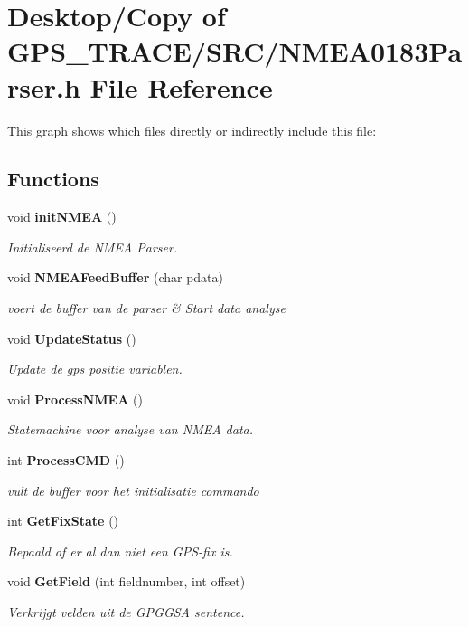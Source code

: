 \section{Desktop/Copy of GPS\_\-TRACE/SRC/NMEA0183Parser.h File Reference}
\label{_n_m_e_a0183_parser_8h}


This graph shows which files directly or indirectly include this file:\subsection*{Functions}
\begin{CompactItemize}
\item 
void {\bf initNMEA} ()
\begin{CompactList}\small\item\em Initialiseerd de NMEA Parser. \item\end{CompactList}\item 
void {\bf NMEAFeedBuffer} (char pdata)
\begin{CompactList}\small\item\em voert de buffer van de parser \& Start data analyse \item\end{CompactList}\item 
void {\bf UpdateStatus} ()
\begin{CompactList}\small\item\em Update de gps positie variablen. \item\end{CompactList}\item 
void {\bf ProcessNMEA} ()
\begin{CompactList}\small\item\em Statemachine voor analyse van NMEA data. \item\end{CompactList}\item 
int {\bf ProcessCMD} ()
\begin{CompactList}\small\item\em vult de buffer voor het initialisatie commando \item\end{CompactList}\item 
int {\bf GetFixState} ()
\begin{CompactList}\small\item\em Bepaald of er al dan niet een GPS-fix is. \item\end{CompactList}\item 
void {\bf GetField} (int fieldnumber, int offset)
\begin{CompactList}\small\item\em Verkrijgt velden uit de GPGGSA sentence. \item\end{CompactList}\end{CompactItemize}
